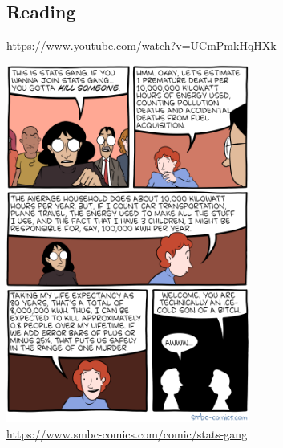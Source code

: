 



\subsection*{Reading}
\begin{center}
\begin{tcolorbox}[width=0.8\textwidth,colback={white},title={\textbf{Go and watch...}},colbacktitle=black,coltitle=white]
  \textcolor{black}{\url{https://www.youtube.com/watch?v=UCmPmkHqHXk}}
\end{tcolorbox}
\end{center}

\begin{center}
  \includegraphics[width=0.6\textwidth]{killerstats}\\
  \small{\url{https://www.smbc-comics.com/comic/stats-gang}}
\end{center}


